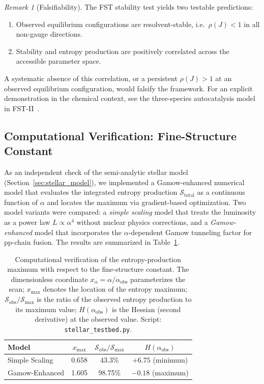 \documentclass[12pt,a4paper]{article}
\theoremstyle{remark}
\newtheorem{remark}{Remark}
\begin{document}
\begin{remark}[Falsifiability]\label{rem:falsifiability-protocol}
The FST stability test yields two testable predictions:
\begin{enumerate}[label=(\roman*)]
  \item Observed equilibrium configurations are resolvent-stable,
        i.e.\ $\rho(J) < 1$ in all non-gauge directions.
  \item Stability and entropy production are positively correlated across
        the accessible parameter space.
\end{enumerate}
A systematic absence of this correlation, or a persistent $\rho(J) > 1$
at an observed equilibrium configuration, would falsify the framework.
For an explicit demonstration in the chemical context, see the
three-species autocatalysis model in FST-II~\cite{FSTII}.
\end{remark}

\subsection{Computational Verification: Fine-Structure Constant}
\label{sec:comp-verification-alpha}

As an independent check of the semi-analytic stellar model (Section~\ref{sec:stellar_model}), we implemented a Gamow-enhanced numerical model that evaluates the integrated entropy production $\mathcal{S}_{\text{total}}$ as a continuous function of $\alpha$ and locates the maximum via gradient-based optimization. Two model variants were compared: a \emph{simple scaling} model that treats the luminosity as a power law $L \propto \alpha^4$ without nuclear physics corrections, and a \emph{Gamow-enhanced} model that incorporates the $\alpha$-dependent Gamow tunneling factor for pp-chain fusion. The results are summarized in Table~\ref{tab:comp-verification-alpha}.

\begin{table}[ht]
\centering
\caption{Computational verification of the entropy-production maximum with respect to the fine-structure constant. The dimensionless coordinate $x_\alpha = \alpha / \alpha_{\text{obs}}$ parameterizes the scan; $x_{\max}$ denotes the location of the entropy maximum; $\mathcal{S}_{\text{obs}} / \mathcal{S}_{\max}$ is the ratio of the observed entropy production to its maximum value; $H(\alpha_{\text{obs}})$ is the Hessian (second derivative) at the observed value. Script: \texttt{stellar\_testbed.py}.}
\label{tab:comp-verification-alpha}
\begin{tabular}{lccc}
\toprule
\textbf{Model} & $x_{\max}$ & $\mathcal{S}_{\text{obs}} / \mathcal{S}_{\max}$ & $H(\alpha_{\text{obs}})$ \\
\midrule
Simple Scaling & 0.658 & 43.3\% & $+6.75$ (minimum) \\
Gamow-Enhanced & 1.605 & 98.75\% & $-0.18$ (maximum) \\
\bottomrule
\end{tabular}
\end{table}
\end{document}
